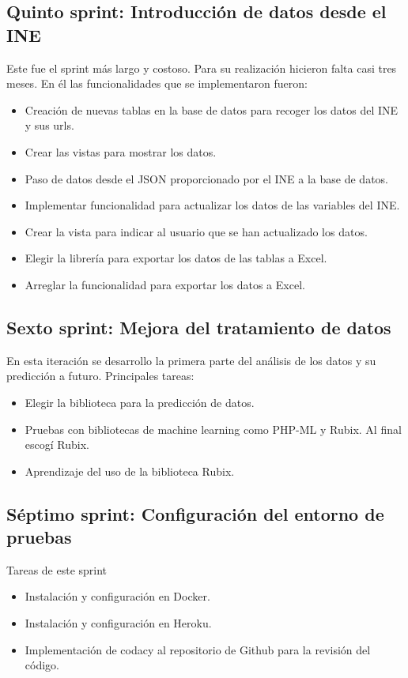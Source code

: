 \subsection{Quinto sprint: Introducción de datos desde el INE}
Este fue el sprint más largo y costoso. Para su realización hicieron falta casi tres meses. En él las funcionalidades que se implementaron fueron:
\begin{itemize}
    \item Creación de nuevas tablas en la base de datos para recoger los datos del INE y sus urls.
    \item Crear las vistas para mostrar los datos.
    \item Paso de datos desde el JSON proporcionado por el INE a la base de datos.
    \item Implementar funcionalidad para actualizar los datos de las variables del INE.  
    \item Crear la vista para indicar al usuario que se han actualizado los datos.
    \item Elegir la librería para exportar los datos de las tablas a Excel.
    \item Arreglar la funcionalidad para exportar los datos a Excel.
\end{itemize}
\subsection{Sexto sprint: Mejora del tratamiento de datos}
En esta iteración se desarrollo la primera parte del análisis de los datos y su predicción a futuro.
Principales tareas:
\begin{itemize}
    \item Elegir la biblioteca para la predicción de datos.
    \item Pruebas con bibliotecas de machine learning como PHP-ML y Rubix. Al final escogí Rubix.
    \item Aprendizaje del uso de la biblioteca Rubix.
\end{itemize}
\subsection{Séptimo sprint: Configuración del entorno de pruebas}
Tareas de este sprint
\begin{itemize}
    \item Instalación y configuración en Docker.
    \item Instalación y configuración en Heroku.
    \item Implementación de codacy al repositorio de Github para la revisión del código.
\end{itemize}
